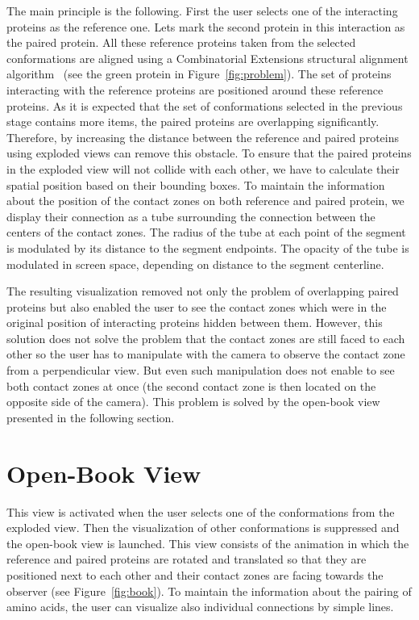 \documentclass[journal]{vgtc}                %
\begin{document}
The main principle is the following.
First the user selects one of the interacting proteins as the reference one.
Lets mark the second protein in this interaction as the paired protein.
All these reference proteins taken from the selected conformations are aligned using a Combinatorial Extensions structural alignment algorithm~\cite{Shindyalov1998} (see the green protein in Figure~\ref{fig:problem}).
The set of proteins interacting with the reference proteins are positioned around these reference proteins.
As it is expected that the set of conformations selected in the previous stage contains more items, the paired proteins are overlapping significantly.
Therefore, by increasing the distance between the reference and paired proteins using exploded views can remove this obstacle.
To ensure that the paired proteins in the exploded view will not collide with each other, we have to calculate their spatial position based on their bounding boxes.
To maintain the information about the position of the contact zones on both reference and paired protein, we display their connection as a tube surrounding the connection between the centers of the contact zones.
The radius of the tube at each point of the segment is modulated by its distance to the segment endpoints.
The opacity of the tube is modulated in screen space, depending on distance to the segment centerline.

The resulting visualization removed not only the problem of overlapping paired proteins but also enabled the user to see the contact zones which were in the original position of interacting proteins hidden between them.
However, this solution does not solve the problem that the contact zones are still faced to each other so the user has to manipulate with the camera to observe the contact zone from a perpendicular view. 
But even such manipulation does not enable to see both contact zones at once (the second contact zone is then located on the opposite side of the camera).
This problem is solved by the open-book view presented in the following section.

\section{Open-Book View}
This view is activated when the user selects one of the conformations from the exploded view. 
Then the visualization of other conformations is suppressed and the open-book view is launched.
This view consists of the animation in which the reference and paired proteins are rotated and translated so that they are positioned next to each other and their contact zones are facing towards the observer (see Figure~\ref{fig:book}). 
To maintain the information about the pairing of amino acids, the user can visualize also individual connections by simple lines.
\end{document}

